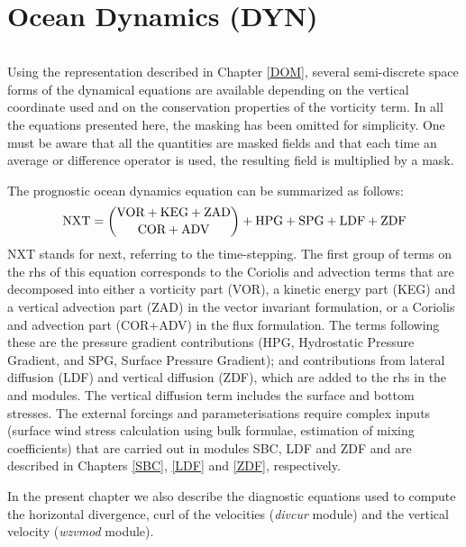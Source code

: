 \documentclass[NEMO_book]{subfiles}
\begin{document}
\chapter{Ocean Dynamics (DYN)}
\label{DYN}
\minitoc

$\ $\newline      %

Using the representation described in Chapter \ref{DOM}, several semi-discrete 
space forms of the dynamical equations are available depending on the vertical 
coordinate used and on the conservation properties of the vorticity term. In all 
the equations presented here, the masking has been omitted for simplicity. 
One must be aware that all the quantities are masked fields and that each time an
average or difference operator is used, the resulting field is multiplied by a mask.

The prognostic ocean dynamics equation can be summarized as follows:
\begin{equation*}
\text{NXT} = \dbinom	{\text{VOR} + \text{KEG} + \text {ZAD} }
						{\text{COR} + \text{ADV}                       }
			+ \text{HPG} + \text{SPG} + \text{LDF} + \text{ZDF}
\end{equation*}
NXT stands for next, referring to the time-stepping. The first group of terms on 
the rhs of this equation corresponds to the Coriolis and advection 
terms that are decomposed into either a vorticity part (VOR), a kinetic energy part (KEG) 
and a vertical advection part (ZAD) in the vector invariant formulation, or a Coriolis 
and advection part (COR+ADV) in the flux formulation. The terms following these 
are the pressure gradient contributions (HPG, Hydrostatic Pressure Gradient, 
and SPG, Surface Pressure Gradient); and contributions from lateral diffusion 
(LDF) and vertical diffusion (ZDF), which are added to the rhs in the  
and  modules. The vertical diffusion term includes the surface and 
bottom stresses. The external forcings and parameterisations require complex 
inputs (surface wind stress calculation using bulk formulae, estimation of mixing 
coefficients) that are carried out in modules SBC, LDF and ZDF and are described 
in Chapters \ref{SBC}, \ref{LDF} and \ref{ZDF}, respectively. 

In the present chapter we also describe the diagnostic equations used to compute 
the horizontal divergence, curl of the velocities (\emph{divcur} module) and 
the vertical velocity (\emph{wzvmod} module).
\end{document}
